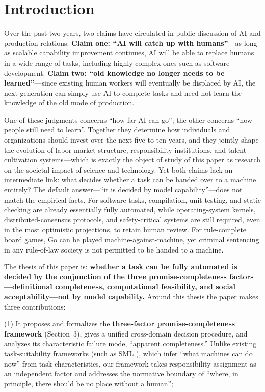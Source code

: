 \documentclass[11pt]{article}
\begin{document}
\section{Introduction}
Over the past two years, two claims have circulated in public discussion of
AI and production relations. \textbf{Claim one: ``AI will catch up with
humans''}---as long as scalable capability improvement continues, AI will
be able to replace humans in a wide range of tasks, including highly
complex ones such as software development. \textbf{Claim two: ``old
knowledge no longer needs to be learned''}---since existing human workers
will eventually be displaced by AI, the next generation can simply use AI
to complete tasks and need not learn the knowledge of the old mode of
production.

One of these judgments concerns ``how far AI can go''; the other concerns
``how people still need to learn''. Together they determine how
individuals and organizations should invest over the next five to ten
years, and they jointly shape the evolution of labor-market structure,
responsibility institutions, and talent-cultivation systems---which is
exactly the object of study of this paper as research on the societal
impact of science and technology. Yet both claims lack an intermediate
link: what decides whether a task can be handed over to a machine
entirely? The default answer---``it is decided by model capability''---does
not match the empirical facts. For software tasks, compilation, unit
testing, and static checking are already essentially fully automated, while
operating-system kernels, distributed-consensus protocols, and
safety-critical systems are still required, even in the most optimistic
projections, to retain human review. For rule-complete board games, Go can
be played machine-against-machine, yet criminal sentencing in any
rule-of-law society is not permitted to be handed to a machine.

The thesis of this paper is: \textbf{whether a task can be fully automated
is decided by the conjunction of the three promise-completeness
factors---definitional completeness, computational feasibility, and social
acceptability---not by model capability.} Around this thesis the paper
makes three contributions:

(1) It proposes and formalizes the \textbf{three-factor promise-completeness
framework} (Section~3), gives a unified cross-domain decision procedure, and
analyzes its characteristic failure mode, ``apparent completeness.''
Unlike existing task-suitability frameworks (such as SML
\cite{sml_aea,sml_science}), which infer ``what machines can do now'' from
task characteristics, our framework takes responsibility assignment as an
independent factor and addresses the normative boundary of ``where, in
principle, there should be no place without a human'';
\end{document}
